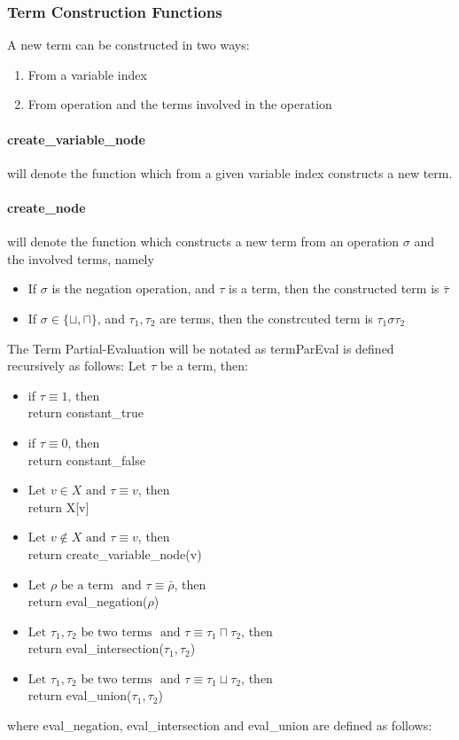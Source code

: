 \documentclass{article}
\begin{document}
		\subsubsection{Term Construction Functions}
		A new term can be constructed in two ways: 
		\begin{enumerate}
			\item From a variable index
			\item From operation and the terms involved in the operation
		\end{enumerate}

		\paragraph{create\_variable\_node} will denote the function which from a given variable index constructs a new term.
		\paragraph{create\_node} will denote the function which constructs a new term from an operation $\sigma$ and the involved terms, namely 
		\begin{itemize}
			\item If $\sigma$ is the negation operation, and $\tau$ is a term, 
				then the constructed term is $\bar{\tau}$
			\item If $\sigma \in \{ \sqcup, \sqcap \}$, and $\tau_1, \tau_2$ are terms, 
				then the constrcuted term is $\tau_1 \sigma \tau_2$
		\end{itemize}

		The Term Partial-Evaluation will be notated as termParEval is defined recursively as follows:
		\newline
		Let $\tau$ be a term, then:
		\begin{itemize}
			\item if $\tau \equiv 1$, then \\
				return constant\_true
			\item if $\tau \equiv 0$, then \\
				return constant\_false
			\item $\text{Let } v \in X \text{ and } \tau \equiv v$, then \\
				return X[v]
			\item $\text{Let } v \not\in X \text{ and } \tau \equiv v$, then \\
				return create\_variable\_node(v)
			\item $\text{Let } \rho \text{ be a term } \text{ and } \tau \equiv \bar{\rho}$, then \\
				return eval\_negation($\rho$)
			\item $\text{Let } \tau_1, \tau_2 \text{ be two terms } \text{ and } \tau \equiv \tau_1 \sqcap \tau_2$, then \\
				return eval\_intersection($\tau_1, \tau_2$)
			\item $\text{Let } \tau_1, \tau_2 \text{ be two terms } \text{ and } \tau \equiv \tau_1 \sqcup \tau_2$, then \\
				return eval\_union($\tau_1, \tau_2$)
		\end{itemize}
		where eval\_negation, eval\_intersection and eval\_union are defined as follows:
			
\end{document}
